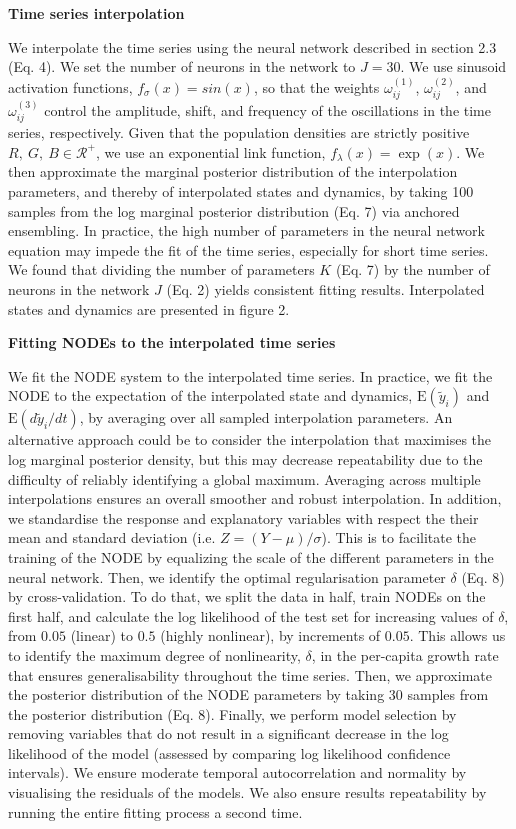 \documentclass[11pt, oneside]{article}
\begin{document}
\textbf{Time series interpolation}

We interpolate the time series using the neural network described in section 2.3 (Eq. 4).
We set the number of neurons in the network to $J=30$.
We use sinusoid activation functions, $f_\sigma(x) = sin(x)$, so that the weights $\omega^{(1)}_{ij}$, $\omega^{(2)}_{ij}$, and $\omega^{(3)}_{ij}$ control the amplitude, shift, and frequency of the oscillations in the time series, respectively.
Given that the population densities are strictly positive $R,~G,~B \in \mathcal{R^{+}}$, we use an exponential link function, $f_\lambda(x) = \exp (x)$. 
We then approximate the marginal posterior distribution of the interpolation parameters, and thereby of interpolated states and dynamics, by taking 100 samples from the log marginal posterior distribution (Eq. 7) via anchored ensembling. %
In practice, the high number of parameters in the neural network equation may impede the fit of the time series, especially for short time series. 
We found that dividing the number of parameters $K$ (Eq. 7) by the number of neurons in the network $J$ (Eq. 2) yields consistent fitting results.
Interpolated states and dynamics are presented in figure 2.

\textbf{Fitting NODEs to the interpolated time series}

We fit the NODE system to the interpolated time series.
In practice, we fit the NODE to the expectation of the interpolated state and dynamics, $\mathrm{E}(\tilde{y}_i)$ and $\mathrm{E}(d\tilde{y}_i/dt)$, by averaging over all sampled interpolation parameters.
An alternative approach could be to consider the interpolation that maximises the log marginal posterior density, but this may decrease repeatability due to the difficulty of reliably identifying a global maximum.
Averaging across multiple interpolations ensures an overall smoother and robust interpolation. 
In addition, we standardise the response and explanatory variables with respect the their mean and standard deviation (i.e. $Z=(Y-\mu)/\sigma$).
This is to facilitate the training of the NODE by equalizing the scale of the different parameters in the neural network.
Then, we identify the optimal regularisation parameter $\delta$ (Eq. 8) by cross-validation.
To do that, we split the data in half, train NODEs on the first half, and calculate the log likelihood of the test set for increasing values of $\delta$, from $0.05$ (linear) to $0.5$ (highly nonlinear), by increments of $0.05$.
This allows us to identify the maximum degree of nonlinearity, $\delta$, in the per-capita growth rate that ensures generalisability throughout the time series.
Then, we approximate the posterior distribution of the NODE parameters by taking 30 samples from the posterior distribution (Eq. 8).
Finally, we perform model selection by removing variables that do not result in a significant decrease in the log likelihood of the model (assessed by comparing log likelihood confidence intervals).
We ensure moderate temporal autocorrelation and normality by visualising the residuals of the models.
We also ensure results repeatability by running the entire fitting process a second time.
\end{document}
